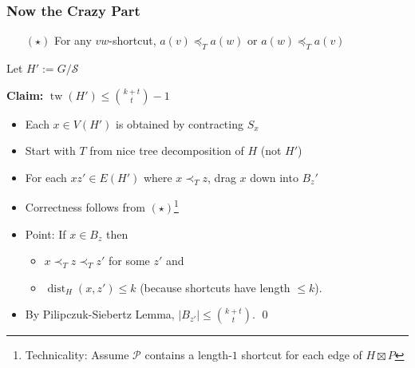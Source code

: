 \documentclass[xcolor=dvipsnames]{beamer}
\DeclareMathOperator{\tw}{tw}
\begin{document}
\begin{frame}
  \frametitle{Now the Crazy Part}

  \begin{itemize}
      \item[$(\star)$] For any $vw$-shortcut, $a(v)\preceq_T a(w)$ or $a(w)\preceq_T a(v)$
  \end{itemize}

    \vspace{.5cm}
    Let $H':=G/\mathcal{S}$
    \vspace{.5cm}

    \textbf{Claim:} $\tw(H')\le\binom{k+t}{t}-1$\\
    \vspace{.5cm}
    \begin{itemize}
      \item<2-> Each $x\in V(H')$ is obtained by contracting $S_x$
      \item<3-> Start with $T$ from nice tree decomposition of $H$ (not $H'$)
      \item<4-> For each $xz'\in E(H')$ where $x\prec_T z$, drag $x$ down into $B_z'$
      \item<5-> Correctness follows from $(\star)$\footnote{Technicality: Assume $\mathcal{P}$ contains a length-$1$ shortcut for each edge of $H\boxtimes P$}
      \item<6-> Point: If $x\in B_{z}$ then
      \begin{itemize}
          \item $x\prec_T z\prec_T z'$ for some $z'$ and
          \item $\mathop{dist}_{H}(x,z')\le k$ (because shortcuts have length $\le\!\!k$).
      \end{itemize}
      \item<7-> By Pilipczuk-Siebertz Lemma, $|B_{z'}|\le \binom{k+t}{t}$.
      \hfill{\qed}
    \end{itemize}
\end{frame}
\end{document}
